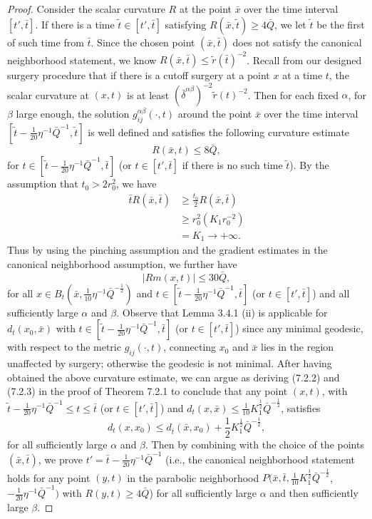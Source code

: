 \begin{proof}
Consider the scalar curvature $R$ at the point $\bar x$ over the
time interval $[t',\bar t]$. If there is a time $\tilde{t} \in
[t',\bar t]$ satisfying $R(\bar x,\tilde{t}) \geq 4\bar Q$, we let
$\tilde{t}$ be the first of such time from $\bar t$. Since the
chosen point $(\bar{x},\bar{t})$ does not satisfy the canonical
neighborhood statement, we know $R(\bar{x},\bar{t})\leq
\widetilde{r}(\bar{t})^{-2}$. Recall from our designed surgery
procedure that if there is a cutoff surgery at a point $x$ at a
time $t$, the scalar curvature at $(x,t)$ is at least
$(\bar{\delta}^{\alpha\beta})^{-2}\widetilde{r}({t})^{-2}$. Then
for each fixed $\alpha$, for $\beta$ large enough, the solution
$g^{\alpha\beta}_{ij}(\cdot,t)$ around the point $\bar x$ over the
time interval $[\tilde{t}-
\frac{1}{20}\eta^{-1}\bar{Q}^{-1},{\tilde{t}}]$ is well defined
and satisfies the following curvature estimate
$$
R(\bar x,t) \leq 8\bar Q,
$$
for $ t \in [\tilde{t}- \frac{1}{20}\eta^{-1}\bar{Q}^{-1},\bar t]$
(or $t \in [t',\bar t]$ if there is no such time $\tilde{t}$). By
the assumption that $t_0>2r^2_0$, we have
\begin{align*}
\bar{t}R(\bar{x},\bar{t})&  \geq
\frac{t_0}{2}R(\bar{x},\bar{t})\\
&  \geq r^2_0(K_1r^{-2}_0)\\
&  = K_1\rightarrow +\infty.
\end{align*}
Thus by using the pinching assumption and the gradient estimates
in the canonical neighborhood assumption, we further have
$$
|Rm(x,t)| \leq 30\bar{Q},
$$
for all $x \in B_t(\bar
x,\frac{1}{10}\eta^{-1}\bar{Q}^{-\frac{1}{2}})$ and $t \in
[\tilde{t}- \frac{1}{20}\eta^{-1}\bar{Q}^{-1},\bar t]$ (or $t \in
[t',\bar t]$) and all sufficiently large $\alpha$ and $\beta$.
Observe that Lemma 3.4.1 (ii) is applicable for $d_t(x_0,\bar{x})$
with $t \in [\tilde{t}- \frac{1}{20}\eta^{-1}\bar{Q}^{-1}, \bar
t]$ (or $t \in [t',\bar t]$) since any minimal geodesic, with
respect to the metric $g_{ij}(\cdot,t)$, connecting $x_0$ and
$\bar{x}$ lies in the region unaffected by surgery; otherwise the
geodesic is not minimal. After having obtained the above curvature
estimate, we can argue as deriving (7.2.2) and (7.2.3) in the
proof of Theorem 7.2.1 to conclude that any point $(x,t)$, with $
\tilde{t}- \frac{1}{20}\eta^{-1}\bar{Q}^{-1} \leq t \leq \bar t$
(or $t \in [t',\bar t]$) and $d_t(x,\bar x) \leq
\frac{1}{10}K_1^{\frac{1}{2}}\bar{Q}^{-\frac{1}{2}}$, satisfies
$$
d_t(x,x_{0}) \leq d_{\bar t}(\bar x,x_{0}) +
\frac{1}{2}K_1^{\frac{1}{2}}\bar{Q}^{-\frac{1}{2}},
$$
for all sufficiently large $\alpha$ and $\beta$. Then by combining
with the choice of the points $(\bar x,\bar t)$, we prove $t'=
\bar t-\frac{1}{20}\eta^{-1}\bar{Q}^{-1}$ (i.e., the canonical
neighborhood statement holds for any point $(y,t)$ in the
parabolic neighborhood $P(\bar x,\bar
t,\frac{1}{10}K_1^{\frac{1}{2}}\bar{Q}^{-\frac{1}{2}}$,$
-\frac{1}{20}\eta^{-1}\bar{Q}^{-1})$ with $R(y,t) \geq 4\bar Q$)
for all sufficiently large $\alpha$ and then sufficiently large
$\beta$.


\end{proof}
